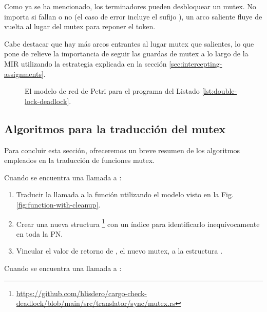 Como ya se ha mencionado, los terminadores  pueden desbloquear un mutex.
No importa si fallan o no (el caso de error incluye el sufijo ),
un arco saliente fluye de vuelta al lugar del mutex para reponer el token.

Cabe destacar que hay más arcos entrantes al lugar mutex que salientes, lo que pone
de relieve la importancia de seguir las guardas de mutex a lo largo de la \acrshort{MIR} utilizando la
estrategia explicada en la sección \ref{sec:intercepting-assignments}.

\begin{figure}[!htbp]
      \centering
      
      \caption{El modelo de red de Petri para el programa del Listado \ref{lst:double-lock-deadlock}.}
      \label{fig:mutex-example}
\end{figure}

\subsection{Algoritmos para la traducción del mutex}
\label{sec:mutex-algorithms}

Para concluir esta sección, ofreceremos un breve resumen de los algoritmos empleados en la
traducción de funciones mutex.

Cuando se encuentra una llamada a :

\begin{enumerate}
      \item Traducir la llamada a la función utilizando el modelo visto en la Fig. \ref{fig:function-with-cleanup}.
      \item Crear una nueva structura \footnote{\url{https://github.com/hlisdero/cargo-check-deadlock/blob/main/src/translator/sync/mutex.rs}}
            con un índice para identificarlo inequívocamente en toda la \acrshort{PN}.
      \item Vincular el valor de retorno de ,
            el nuevo mutex, a la estructura .
\end{enumerate}

Cuando se encuentra una llamada a :

